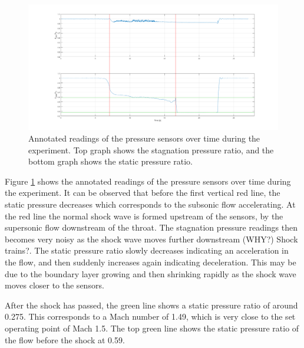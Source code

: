 \documentclass[8pt]{article}
\begin{document}
\begin{figure}[H]
    \centering
    \includegraphics[width=1\textwidth]{tunnel_pressures_annotated.png}
    \caption{Annotated readings of the pressure sensors over time during the experiment. Top graph shows the stagnation pressure ratio, and the bottom graph shows the static pressure ratio.}
    \label{fig:figure8}
\end{figure}

Figure \ref{fig:figure8} shows the annotated readings of the pressure sensors over time during the experiment.
It can be observed that before the first vertical red line, the static pressure decreases which corresponds to the subsonic flow accelerating.
At the red line the normal shock wave is formed upstream of the sensors, by the supersonic flow downstream of the throat.
The stagnation pressure readings then becomes very noisy as the shock wave moves further downstream (WHY?) Shock trains?.
The static pressure ratio slowly decreases indicating an acceleration in the flow, and then suddenly increases again indicating deceleration.
This may be due to the boundary layer growing and then shrinking rapidly as the shock wave moves closer to the sensors.

After the shock has passed, the green line shows a static pressure ratio of around 0.275. This corresponds to a Mach number of 1.49, which is very close to the set operating point of Mach 1.5.
The top green line shows the static pressure ratio of the flow before the shock at 0.59.
\end{document}
